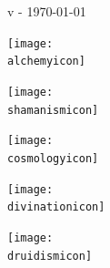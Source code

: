 
\begin{titlepage}
\begin{center}

\vspace*{10pt}

\ifdef{\booktitle}{}{\newcommand{\booktitle}{Missing title}}
\ifdef{\version}{}{\newcommand{\version}{Missing version}}

{\titlefont\fontsize{40}{48}\selectfont\noindent{}

}

\vspace*{10pt}

{\titlefont\fontsize{50}{60}\selectfont \booktitle
\vspace{5pt}

\fontsize{14}{16.8}\selectfont v\version{} - \today{}}


\vspace*{20pt}

\newcommand{\iconheight}{1.6cm}
\newcommand{\minipagewidth}{3cm}
\newcommand{\spacebetweeniconrows}{0.8cm}

\hspace*{0.5cm}\begin{minipage}[c]{\minipagewidth}
\begin{center}
\texttt{[image: \\alchemyicon]}

\vspace*{\spacebetweeniconrows}

\texttt{[image: \\shamanismicon]}

\vspace*{\spacebetweeniconrows}

\texttt{[image: \\cosmologyicon]}

\vspace*{\spacebetweeniconrows}

\texttt{[image: \\divinationicon]}

\vspace*{\spacebetweeniconrows}

\texttt{[image: \\druidismicon]}

\end{center}
\end{minipage}
\hfill\begin{minipage}[c]{8cm}


\end{minipage}
\end{center}
\end{titlepage}
